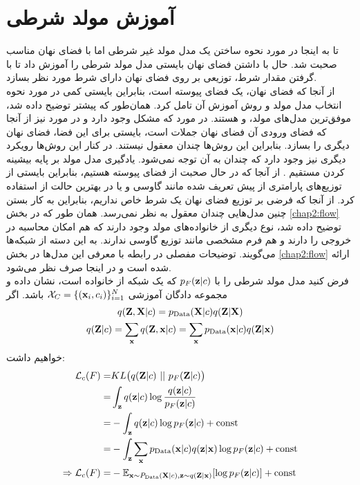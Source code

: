 \section{آموزش مولد شرطی}
تا به اینجا در مورد نحوه ساختن یک مدل مولد غیر شرطی اما با فضای نهان مناسب صحبت شد. حال با داشتن فضای نهان بایستی مدل مولد شرطی را آموزش داد تا با گرفتن مقدار شرط، توزیعی بر روی فضای نهان دارای شرط مورد نظر بسازد.
\\
از آنجا که فضای نهان، یک فضای پیوسته است، بنابراین بایستی کمی در مورد نحوه انتخاب مدل مولد و روش آموزش آن تامل کرد. همان‌طور که پیشتر توضیح داده شد، موفق‌ترین مدل‌های مولد، \gan{} و \vae{} هستند. در مورد \gan{} که مشکل \modecollapse{} وجود دارد و در مورد \vae{} نیز از آنجا که فضای ورودی آن فضای نهان جملات است، بایستی برای این فضا، فضای نهان دیگری را بسازد. بنابراین این روش‌ها چندان معقول نیستند. در کنار این روش‌ها رویکرد دیگری نیز وجود دارد که چندان به آن توجه نمی‌شود. یادگیری مدل مولد بر پایه بیشینه کردن مستقیم \likelihood{}. از آنجا که در حال صحبت از فضای پیوسته هستیم، بنابراین بایستی از توزیع‌های پارامتری از پیش تعریف شده مانند گاوسی و یا در بهترین حالت از
استفاده کرد. از آنجا که فرضی بر توزیع فضای نهان یک شرط خاص نداریم، بنابراین به کار بستن چنین مدل‌هایی چندان معقول به نظر نمی‌رسد. همان طور که در بخش \ref{chap2:flow}‌ توضیح داده شد، نوع دیگری از خانواده‌های مولد وجود دارند که هم امکان محاسبه \likelihood{} در خروجی را دارند و هم فرم مشخصی مانند توزیع گاوسی ندارند. به این دسته از شبکه‌ها \normalizingflownets{} می‌گویند. توضیحات مفصلی در رابطه با معرفی این مدل‌ها در بخش \ref{chap2:flow} ارائه شده است و در اینجا صرف نظر می‌شود.
\\
فرض کنید مدل مولد شرطی را با $p_F({\bf z}|c)$ که یک شبکه از خانواده \normalizingflownets{} است، نشان داده و مجموعه دادگان آموزشی
$\mathcal{X}_C = \{({\bf x}_i, c_i)\}_{i=1}^{N}$
باشد. اگر
\begin{gather}
	q({\bf Z}, {\bf X}|c) = p_\text{Data}({\bf X}|c) q({\bf Z}|{\bf X})
	\\
	q({\bf Z}|c) = \sum_{\bf x} q({\bf Z}, {\bf x}|c)
    = \sum_{\bf x} p_\text{Data}({\bf x}|c) q({\bf Z}|{\bf x})
\end{gather}
خواهیم داشت:
\begin{align}
	\mathcal{L}_c (F) = & KL\big(q({\bf Z}|c) ~ || ~ p_F({\bf Z}|c)\big) \nonumber                                          \\
	=                   & \int_{\bf z} q({\bf z}|c) \log \frac{q({\bf z}|c)}{p_F({\bf z}|c) \nonumber}                                  \\
	=                   & -\int_{\bf z} q({\bf z}|c) \log p_F({\bf z}|c) + \text{const} \nonumber                                 \\
	=                   & -\int_{\bf z} \sum_{\bf x} p_\text{Data}({\bf x}|c) q({\bf z}|{\bf x}) \log p_F({\bf z}|c) + \text{const} \nonumber       \\
	\Rightarrow
	\mathcal{L}_c (F) = & - \mathbb E_{{\bf x} \sim P_\text{Data}({\bf X}|c), {\bf z} \sim q({\bf Z}|{\bf x})} [\log p_F({\bf z}|c)] + \text{const}
\end{align}
